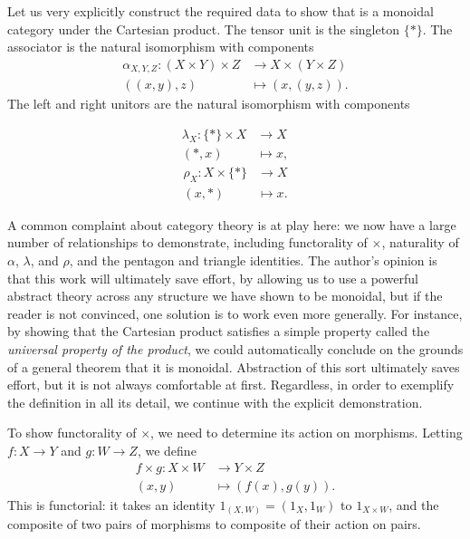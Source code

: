 \begin{ex}\label{ex:set-monoidal}
  Let us very explicitly construct the required data to show that
   is a monoidal category under the Cartesian product. The tensor unit
  is the singleton $\{*\}$. The associator is the natural isomorphism with
  components \begin{align*}
    \alpha_{X,Y,Z} \colon (X\times Y)\times Z &\to X\times(Y\times Z)\\
    ((x, y), z) &\mapsto (x, (y, z)).
  \end{align*}
  The left and right unitors are the natural isomorphism with components
  \begin{multicols}{2}
    \noindent
    \begin{align*}
      \lambda_X \colon \{*\}\times X &\to X \\
      (*, x) &\mapsto x,
    \end{align*}
    \begin{align*}
      \rho_X \colon X\times\{*\} &\to X \\
      (x, *) &\mapsto x.
    \end{align*}
  \end{multicols}

  A common complaint about category theory is at play here: we now have a
  large number of relationships to demonstrate, including
  functorality of $\times$, naturality of $\alpha$, $\lambda$, and $\rho$, and
  the pentagon and triangle identities. The author's opinion is that this work
  will ultimately save effort, by allowing us to use a powerful abstract theory
  across any structure we have shown to be monoidal, but if the reader is not
  convinced, one solution is to work even more generally. For instance, by
  showing that the Cartesian product satisfies a simple property called the
  \emph{universal property of the product}, we could automatically conclude on
  the grounds of a general theorem that it is monoidal. Abstraction of this sort
  ultimately saves effort, but it is not always comfortable at first.
  Regardless, in order to exemplify the definition in all its detail, we
  continue with the explicit demonstration.

  To show functorality of $\times$, we need to determine its action on
  morphisms. Letting $f: X\to Y$ and $g: W\to Z$, we define \begin{align*}
    f\times g\colon X\times W &\to Y\times Z \\
                       (x, y) &\mapsto (f(x), g(y)).
  \end{align*}
  This is functorial: it takes an identity $1_{(X, W)} = (1_X, 1_W)$ to
  $1_{X\times W}$, and the composite of two pairs of morphisms to composite of
  their action on pairs.


\end{ex}
